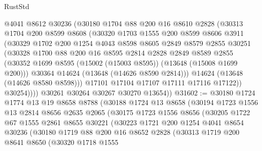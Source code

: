 \begin{lexlean}{RustStd}
\begin{coremodule}
              @4041
              @8612
              @30236
              (@30180
                @1704
                @88
                @200
                @16
                @8610
                @2828
                (@30313
                  @1704
                  @200
                  @8599
                  @8608
                  (@30320
                    @1703
                    @1555
                    @200
                    @8599
                    @8606
                    @3911
                    (@30329
                      @1702
                      @200
                      @1254
                      @4043
                      @8598
                      @8605
                      @2849
                      @8579
                      @2855
                      @30251
                      (@30328
                        @1700
                        @88
                        @200
                        @16
                        @8595
                        @2814
                        @2828
                        @2849
                        @8589
                        @2855
                        (@30352 @1699 @8595 (@15002 (@15003 @8595)) (@13648 (@15008 @1699 @200)))
                        @30364
                        @14624
                        (@13648 (@14626 @8590 @2814)))
                      @14624
                      (@13648 (@14626 @8580 @8598)))
                    @17101
                    @17104
                    @17107
                    @17111
                    @17116
                    @17122))
                @30254))))
        @30261
        @30264
        @30267
        @30270
        @13654))
@31602 := @30180
    @1724
    @1774
    @13
    @19
    @8658
    @8788
    (@30188
      @1724
      @13
      @8658
      (@30194
        @1723
        @1556
        @13
        @2814
        @8656
        @2635
        @2065
        (@30175
          @1723
          @1556
          @8656
          (@30205
            @1722
            @67
            @1555
            @2861
            @8655
            @30221
            (@30223
              @1721
              @200
              @1254
              @4041
              @8654
              @30236
              (@30180
                @1719
                @88
                @200
                @16
                @8652
                @2828
                (@30313
                  @1719
                  @200
                  @8641
                  @8650
                  (@30320
                    @1718
                    @1555

\end{coremodule}
\end{lexlean}
